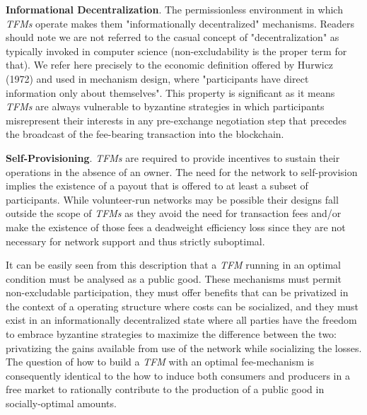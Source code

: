 \documentclass[sigconf,anonymous]{aamas}
\renewcommand{\paragraph}[1]{\smallskip\noindent\textbf{#1}}
\begin{document}
\paragraph{Informational Decentralization}. The permissionless environment in which \textit{TFMs} operate makes them "informationally decentralized" mechanisms. Readers should note we are not referred to the casual concept of "decentralization" as typically invoked in computer science (non-excludability is the proper term for that). We refer here precisely to the economic definition offered by Hurwicz (1972) and used in mechanism design, where "participants have direct information only about themselves". This property is significant as it means \textit{TFMs} are always vulnerable to byzantine strategies in which participants misrepresent their interests in any pre-exchange negotiation step that precedes the broadcast of the fee-bearing transaction into the blockchain.

\paragraph{Self-Provisioning}. \textit{TFMs} are required to provide incentives to sustain their operations in the absence of an owner. The need for the network to self-provision implies the existence of a payout that is offered to at least a subset of participants. While volunteer-run networks may be possible their designs fall outside the scope of \textit{TFMs} as they avoid the need for transaction fees and/or make the existence of those fees a deadweight efficiency loss since they are not necessary for network support and thus strictly suboptimal.

It can be easily seen from this description that a \textit{TFM} running in an optimal condition must be analysed as a public good. These mechanisms must permit non-excludable participation, they must offer benefits that can be privatized in the context of a operating structure where costs can be socialized, and they must exist in an informationally decentralized state where all parties have the freedom to embrace byzantine strategies to maximize the difference between the two: privatizing the gains available from use of the network while socializing the losses. The question of how to build a \textit{TFM} with an optimal fee-mechanism is consequently identical to the how to induce both consumers and producers in a free market to rationally contribute to the production of a public good in socially-optimal amounts.
\end{document}
